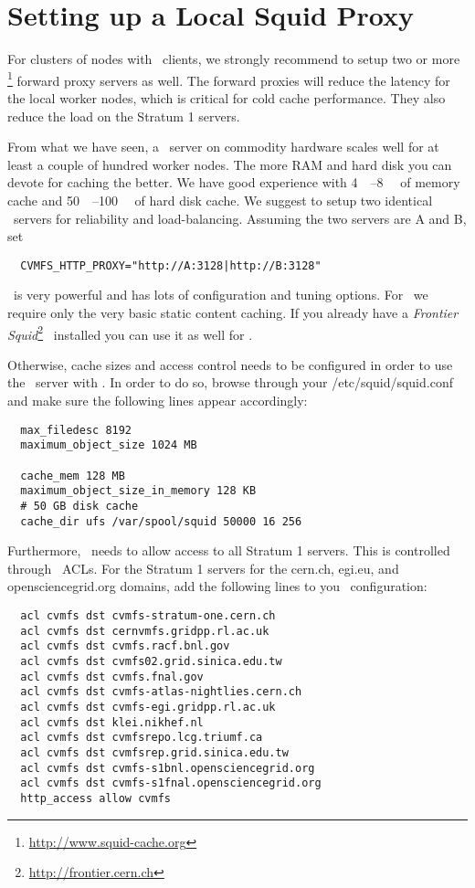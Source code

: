 \chapter{Setting up a Local Squid Proxy}
\label{sct:squid}

For clusters of nodes with \cvmfs\ clients, we strongly recommend to setup two or more \squid\footnote{\url{http://www.squid-cache.org}} forward proxy servers as well.
The forward proxies will reduce the latency for the local worker nodes, which is critical for cold cache performance. 
They also reduce the load on the Stratum 1 servers.

From what we have seen, a \squid\ server on commodity hardware scales well for at least a couple of hundred worker nodes.
The more RAM and hard disk you can devote for caching the better.
We have good experience with \SIrange{4}{8}{\giga\byte} of memory cache and \SIrange{50}{100}{\giga\byte} of hard disk cache.
We suggest to setup two identical \squid\ servers for reliability and load-balancing.
Assuming the two servers are A and B, set
\begin{verbatim}
  CVMFS_HTTP_PROXY="http://A:3128|http://B:3128"
\end{verbatim}

\squid\ is very powerful and has lots of configuration and tuning options.
For \cvmfs\ we require only the very basic static content caching.
If you already have a \emph{Frontier Squid}\footnote{\url{http://frontier.cern.ch}}~\cite{frontier08, frontier10} installed you can use it as well for \cvmfs.

Otherwise, cache sizes and access control needs to be configured in order to use the \squid\ server with \cvmfs.
In order to do so, browse through your /etc/squid/squid.conf and make sure the following lines appear accordingly:
\begin{verbatim}
  max_filedesc 8192
  maximum_object_size 1024 MB

  cache_mem 128 MB
  maximum_object_size_in_memory 128 KB
  # 50 GB disk cache
  cache_dir ufs /var/spool/squid 50000 16 256
\end{verbatim}

Furthermore, \squid\ needs to allow access to all Stratum 1 servers.
This is controlled through \squid\ ACLs.
For the Stratum 1 servers for the cern.ch, egi.eu, and opensciencegrid.org domains, add the following lines to you \squid\ configuration:
\begin{verbatim}
  acl cvmfs dst cvmfs-stratum-one.cern.ch
  acl cvmfs dst cernvmfs.gridpp.rl.ac.uk
  acl cvmfs dst cvmfs.racf.bnl.gov
  acl cvmfs dst cvmfs02.grid.sinica.edu.tw
  acl cvmfs dst cvmfs.fnal.gov
  acl cvmfs dst cvmfs-atlas-nightlies.cern.ch
  acl cvmfs dst cvmfs-egi.gridpp.rl.ac.uk
  acl cvmfs dst klei.nikhef.nl
  acl cvmfs dst cvmfsrepo.lcg.triumf.ca
  acl cvmfs dst cvmfsrep.grid.sinica.edu.tw
  acl cvmfs dst cvmfs-s1bnl.opensciencegrid.org
  acl cvmfs dst cvmfs-s1fnal.opensciencegrid.org
  http_access allow cvmfs
\end{verbatim}

